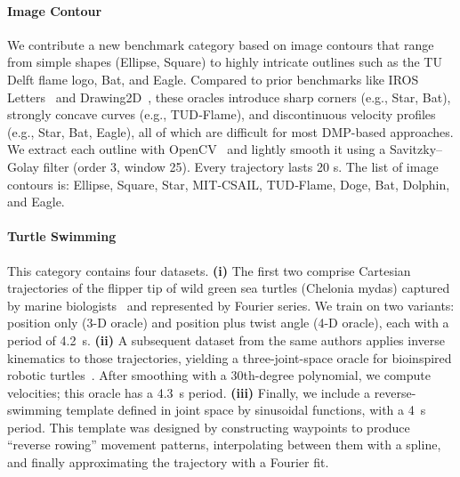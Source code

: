 \paragraph{Image Contour}
% 
We contribute a new benchmark category based on image contours that range from simple shapes (Ellipse, Square) to highly intricate outlines such as the TU Delft flame logo, Bat, and Eagle. Compared to prior benchmarks like IROS Letters~\citep{urain2020imitationflow} and Drawing2D~\citep{nawaz2024learning}, these oracles introduce sharp corners (e.g., Star, Bat), strongly concave curves (e.g., TUD‐Flame), and discontinuous velocity profiles (e.g., Star, Bat, Eagle), all of which are difficult for most DMP-based approaches.
We extract each outline with OpenCV~\citep{bradski2000opencv} and lightly smooth it using a Savitzky–Golay filter (order 3, window 25). Every trajectory lasts 20 s.
% 
The list of image contours is: Ellipse, Square, Star, MIT‐CSAIL, TUD‐Flame, Doge, Bat, Dolphin, and Eagle. 

\paragraph{Turtle Swimming}
This category contains four datasets.
\textbf{(i)} The first two comprise Cartesian trajectories of the flipper tip of wild green sea turtles (Chelonia mydas) captured by marine biologists~\citep{van2022new} and represented by Fourier series. We train on two variants: position only (3-D oracle) and position plus twist angle (4-D oracle), each with a period of \SI{4.2}{s}.
\textbf{(ii)} A subsequent dataset from the same authors applies inverse kinematics to those trajectories, yielding a three-joint-space oracle for bioinspired robotic turtles~\citep{van2023soft}. After smoothing with a 30th-degree polynomial, we compute velocities; this oracle has a \SI{4.3}{s} period.
\textbf{(iii)} Finally, we include a reverse-swimming template defined in joint space by sinusoidal functions, with a \SI{4}{s} period. This template was designed by constructing waypoints to produce ``reverse rowing'' movement patterns, interpolating between them with a spline, and finally approximating the trajectory with a Fourier fit.

